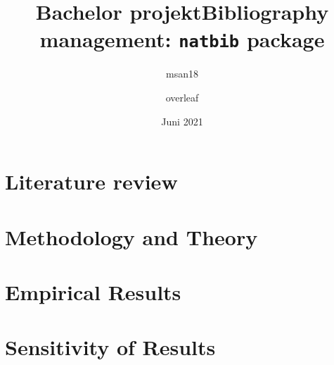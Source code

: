 \documentclass[danish ,a4paper,12pt]{article}
\title{Bachelor projekt}
\author{msan18 }
\date{Juni 2021}
\title{Bibliography management: \texttt{natbib} package}
\author{overleaf}
\date{}
\begin{document}
\linespread{1.5}


\frontmatter




\linespread{1.5}
\selectfont


\pagebreak


\linespread{1.1}
\selectfont



\tableofcontents*	
\newpage

\vspace{1.5 cm}
\selectfont

\linespread{1.5}
\selectfont


\renewcommand{\cleardoublepage}{\newpage}
\mainmatter








\pagebreak

\section{Literature review} \label{lit_rev}

\pagebreak

\section{Methodology and Theory} \label{sec:method}

\pagebreak

\section{Empirical Results} \label{sec:results}

\pagebreak

\section{Sensitivity of Results} \label{sec:sensitivity}

\pagebreak
\end{document}
